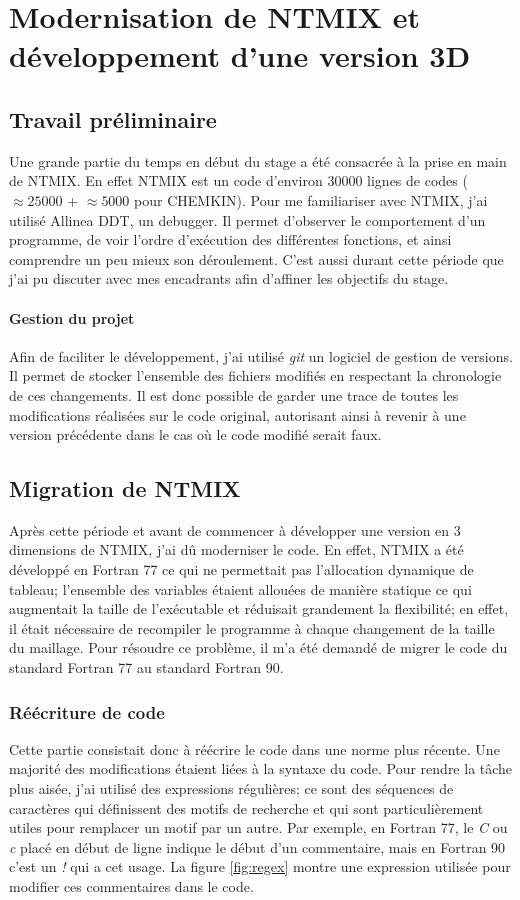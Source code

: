 \section{Modernisation de NTMIX et développement d'une version 3D}
\label{sec:part1}

\subsection{Travail préliminaire}
Une grande partie du temps en début du stage a été consacrée à la prise en main de NTMIX. En effet NTMIX est un code d'environ 30000 lignes de codes ($\approx 25000$ + $\approx 5000$ pour CHEMKIN). Pour me familiariser avec NTMIX, j'ai utilisé Allinea DDT, un debugger. Il permet d'observer le comportement d'un programme, de voir l'ordre d'exécution des différentes fonctions, et ainsi comprendre un peu mieux son déroulement. C'est aussi durant cette période que j'ai pu discuter avec mes encadrants afin d'affiner les objectifs du stage.

\paragraph{Gestion du projet}Afin de faciliter le développement, j'ai utilisé \textit{git} un logiciel de gestion de versions. Il permet de stocker l'ensemble des fichiers modifiés en respectant la chronologie de ces changements. Il est donc possible de garder une trace de toutes les modifications réalisées sur le code original, autorisant ainsi à revenir à une version précédente dans le cas où le code modifié serait faux.
 
\subsection{Migration de NTMIX}
Après cette période et avant de commencer à développer une version en 3 dimensions de NTMIX, j'ai dû moderniser le code. En effet, NTMIX a été développé en Fortran 77 ce qui ne permettait pas l'allocation dynamique de tableau; l'ensemble des variables étaient allouées de manière statique ce qui augmentait la taille de l'exécutable et réduisait grandement la flexibilité; en effet, il était nécessaire de recompiler le programme à chaque changement de la taille du maillage. Pour résoudre ce problème, il m'a été demandé de migrer le code du standard Fortran 77 au standard Fortran 90.

\subsubsection{Réécriture de code}Cette partie consistait donc à réécrire le code dans une norme plus récente. Une majorité des modifications étaient liées à la syntaxe du code. Pour rendre la tâche plus aisée, j'ai utilisé des expressions régulières; ce sont des séquences de caractères qui définissent des motifs de recherche et qui sont particulièrement utiles pour remplacer un motif par un autre. Par exemple, en Fortran 77, le \textit{C} ou \textit{c} placé en début de ligne indique le début d'un commentaire, mais en Fortran 90 c'est un \textit{!} qui a cet usage. La figure \ref{fig:regex} montre une expression utilisée pour modifier ces commentaires dans le code.

